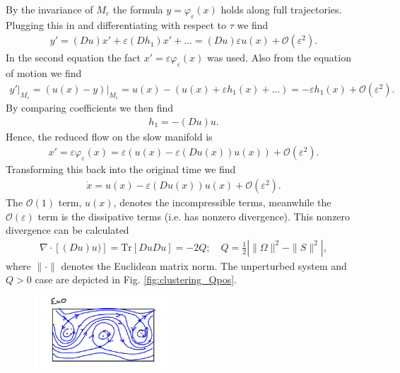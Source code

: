 \begin{ex}
By the invariance of $M_{\varepsilon}$ the formula $y=\varphi_{\varepsilon}(x)$ holds along full trajectories. Plugging this in and differentiating with respect to $\tau$ we find
\begin{align}
	y' = (Du)x' + \varepsilon (Dh_{1})x' + \ldots = (Du) \varepsilon u(x) + \mathcal{O}(\varepsilon^{2}).
\end{align}
In the second equation the fact $x'=\varepsilon \varphi_{\varepsilon}(x)$ was used. Also from the equation of motion we find
\begin{align}
	\left. y'\right|_{M_{\varepsilon}} = \left. \left(u(x) - y\right) \right|_{M_{\varepsilon}} = u(x) - \left(u(x) + \varepsilon h_{1}(x) + \ldots\right) = - \varepsilon h_{1}(x) + \mathcal{O}(\varepsilon^{2}).
\end{align}
By comparing coefficients we then find
\begin{align}
	h_{1} = - (Du)u.
\end{align}
Hence, the reduced flow on the slow manifold is
\begin{align}
	x' = \varepsilon \varphi_{\varepsilon}(x) = \varepsilon \left( u(x) - \varepsilon (Du(x)) u(x) \right) + \mathcal{O}(\varepsilon^{2}).
\end{align}
Transforming this back into the original time we find
\begin{align}
	\dot{x} = u(x) - \varepsilon (Du(x))u(x) + \mathcal{O}(\varepsilon^{2}).
\end{align}
The $\mathcal{O}(1)$ term, $u(x)$, denotes the incompressible terms, meanwhile the $\mathcal{O}(\varepsilon)$ term is the dissipative terms (i.e. has nonzero divergence). This nonzero divergence can be calculated
\begin{align}
	\nabla \cdot \left[ (Du)u) \right] =  \textrm{Tr} \left[ Du Du\right] = - 2Q;\quad Q = \frac{1}{2}\left| \|\Omega\|^{2} - \| S\|^{2} \right|,
\end{align}
where $\| \cdot \|$ denotes the Euclidean matrix norm. The unperturbed system and $Q>0$ case are depicted in Fig. \ref{fig:clustering_Qpos}.
\begin{figure}[h!]
	\centering
	\includegraphics[width=0.45\textwidth]{figures/ch9/23a_Qpos_clustering.png}

\end{figure}
\end{ex}
